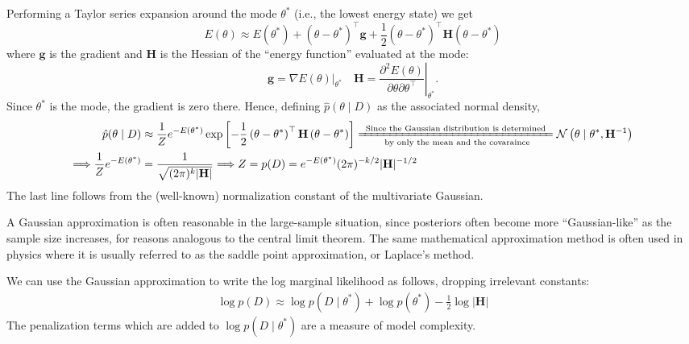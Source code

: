 \documentclass[11pt]{article}
\theoremstyle{plain} %
\theoremstyle{remark}
\begin{document}
Performing a Taylor series expansion around the mode $\theta^{*}$ (i.e.,
the lowest energy state) we get
$$
  E(\theta) \approx E\left(\theta^{*}\right)+\left(\theta-\theta^{*}\right)^\top \mathbf{g}+\frac{1}{2}\left(\theta-\theta^{*}\right)^\top \mathbf{H}\left(\theta-\theta^{*}\right)
$$
where $\mathbf{g}$ is the gradient and $\mathbf{H}$ is the Hessian of the ``energy function'' evaluated at the mode:
$$
  \mathbf{g}=\left.\nabla E(\theta)\right|_{\theta^{*}} \quad \mathbf{H}=\left.\frac{\partial^{2} E(\theta)}{\partial \theta \partial \theta^\top}\right|_{\theta^{*}} .
$$
Since $\theta^{*}$ is the mode, the gradient is zero there. Hence, defining $\hat{p}(\theta \mid D)$ as the associated normal density,
$$
  \begin{aligned}
    \hat{p}(\theta \mid D) & \approx \frac{1}{Z} e^{-E\left(\theta^{*}\right)} \exp \left[-\frac{1}{2}\left(\theta-\theta^{*}\right)^\top \mathbf{H}\left(\theta-\theta^{*}\right)\right] \xlongequal[\text{ by only the mean and the covaraince}]{\text{ Since the Gaussian distribution is determined }} \mathcal{N}\left(\theta \mid \theta^{*}, \mathbf{H}^{-1}\right)                                                                                                       \\
   \Longrightarrow \frac{1}{Z} e^{-E\left(\theta^{*}\right)} & = \frac{1}{\sqrt{(2\pi)^k|\mathbf{H}|}} \Longrightarrow Z=p(D) =e^{-E\left(\theta^{*}\right)}(2 \pi)^{-k / 2}|\mathbf{H}|^{-1 / 2}
  \end{aligned}
$$
The last line follows from the (well-known) normalization constant of
the multivariate Gaussian. 

A Gaussian approximation is often reasonable in the large-sample
situation, since posteriors often become more ``Gaussian-like'' as the sample
size increases, for reasons analogous to the central limit theorem. The same mathematical approximation method is often used in physics
where it is usually referred to as the saddle point approximation, or
Laplace's method. 

We can use the Gaussian approximation to write the log marginal
likelihood as follows, dropping irrelevant constants:
\begin{align}
  \log p(D) \approx \log p\left(D \mid \theta^{*}\right)+\log p\left(\theta^{*}\right)-\frac{1}{2} \log |\mathbf{H}|
  \label{eq:gaussian approximation for log marginal likelihood}
\end{align}
The penalization terms which are added to $\log p\left(D \mid \theta^{*}\right)$ are a measure of model complexity.
\end{document}
